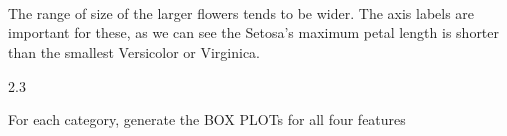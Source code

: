 \documentclass[11pt]{article}
\begin{document}
    \begin{center}
    \end{center}
    { \hspace*{\fill} \\}
    
    \begin{center}
    \end{center}
    { \hspace*{\fill} \\}
    
    \begin{center}
    \end{center}
    { \hspace*{\fill} \\}
    
    The range of size of the larger flowers tends to be wider. The axis
labels are important for these, as we can see the Setosa's maximum petal
length is shorter than the smallest Versicolor or Virginica.

2.3

For each category, generate the BOX PLOTs for all four features
\end{document}
